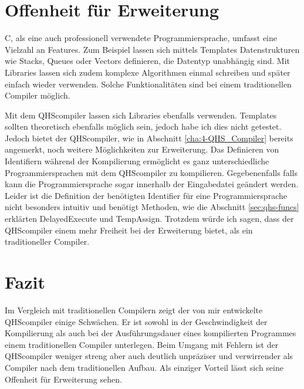 \section{Offenheit für Erweiterung}
C, als eine auch professionell verwendete Programmiersprache, umfasst eine Vielzahl an Features.
Zum Beispiel lassen sich mittels Templates Datenstrukturen wie Stacks, Queues oder Vectors definieren, die Datentyp unabhängig sind.
Mit Libraries lassen sich zudem komplexe Algorithmen einmal schreiben und später einfach wieder verwenden. Solche Funktionalitäten sind bei einem traditionellen Compiler möglich.

Mit dem QHScompiler lassen sich Libraries ebenfalls verwenden. Templates sollten theoretisch ebenfalls möglich sein, jedoch habe ich dies nicht getestet.
Jedoch bietet der QHScompiler, wie in Abschnitt \ref{cha:4-QHS_Compiler} bereits angemerkt, noch weitere Möglichkeiten zur Erweiterung. 
Das Definieren von Identifiern während der Kompilierung ermöglicht es ganz unterschiedliche Programmiersprachen mit dem QHScompiler zu kompilieren.
Gegebenenfalls falls kann die Programmiersprache sogar innerhalb der Eingabedatei geändert werden. 
Leider ist die Definition der benötigten Identifier für eine Programmiersprache nicht besonders intuitiv und benötigt Methoden, wie die Abschnitt \ref{sec:qhs-funcs} erklärten DelayedExecute und TempAssign.
Trotzdem würde ich sagen, dass der QHScompiler einem mehr Freiheit bei der Erweiterung bietet, als ein traditioneller Compiler.

\section{Fazit}
Im Vergleich mit traditionellen Compilern zeigt der von mir entwickelte QHScompiler einige Schwächen.
Er ist sowohl in der Geschwindigkeit der Kompilierung als auch bei der Ausführungsdauer eines kompilierten Programmes einem traditionellen Compiler unterlegen.
Beim Umgang mit Fehlern ist der QHScompiler weniger streng aber auch deutlich unpräziser und verwirrender als Compiler nach dem traditionellen Aufbau.
Als einziger Vorteil lässt sich seine Offenheit für Erweiterung sehen.

